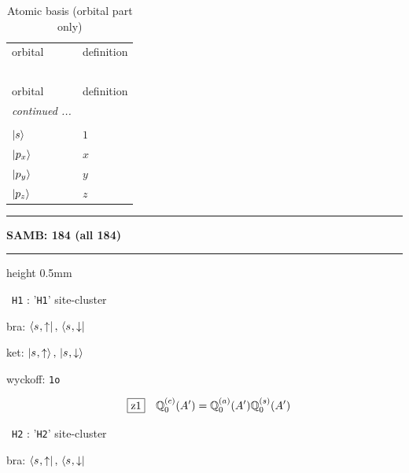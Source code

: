 \documentclass[fleqn,10pt,landscape]{jsarticle}
\begin{document}
\renewcommand{\arraystretch}{1.6}
\begin{longtable}[l]{ll}
\captionsetup{justification=raggedright, singlelinecheck=off}
\caption{Atomic basis (orbital part only)}
 \\
 \hline \hline
orbital & definition \\ \hline \endfirsthead

\multicolumn{1}{l}{\tablename\ \thetable{}} \\
 \hline \hline
orbital & definition \\ \hline \endhead

 \hline \hline
\multicolumn{1}{r}{\footnotesize\it continued ...} \\ \endfoot

 \hline \hline
\multicolumn{1}{r}{} \\ \endlastfoot

$ \ket{s} $ & $ 1 $ \\ \hline
$ \ket{p_{x}} $ & $ x $ \\
$ \ket{p_{y}} $ & $ y $ \\
$ \ket{p_{z}} $ & $ z $ \\
\end{longtable}
\vspace{5mm}
\noindent \rule[0.5mm]{5mm}{0.5mm}\hspace{3mm}\textbf{SAMB: 184 (all 184)}\hspace{3mm}\leaders\hrule height 0.5mm\hfill\kern0pt
\vspace{3mm}

\vspace{5mm}

\noindent\textbullet\, \texttt{H1} : '\texttt{H1}' site-cluster

\noindent\quad * bra: $\bra{s_{},\uparrow},\, \bra{s_{},\downarrow}$

\noindent\quad * ket: $\ket{s_{},\uparrow},\, \ket{s_{},\downarrow}$

\noindent\quad * wyckoff: \texttt{1o}

\begin{dmath*}
\hspace*{3mm}\fbox{z1}\quad \mathbb{Q}_{0}^{(c)}(A^{\prime})=\mathbb{Q}_{0}^{(a)}(A^{\prime}) \mathbb{Q}_{0}^{(s)}(A^{\prime})
\end{dmath*}
\vspace{5mm}

\noindent\textbullet\, \texttt{H2} : '\texttt{H2}' site-cluster

\noindent\quad * bra: $\bra{s_{},\uparrow},\, \bra{s_{},\downarrow}$
\end{document}
